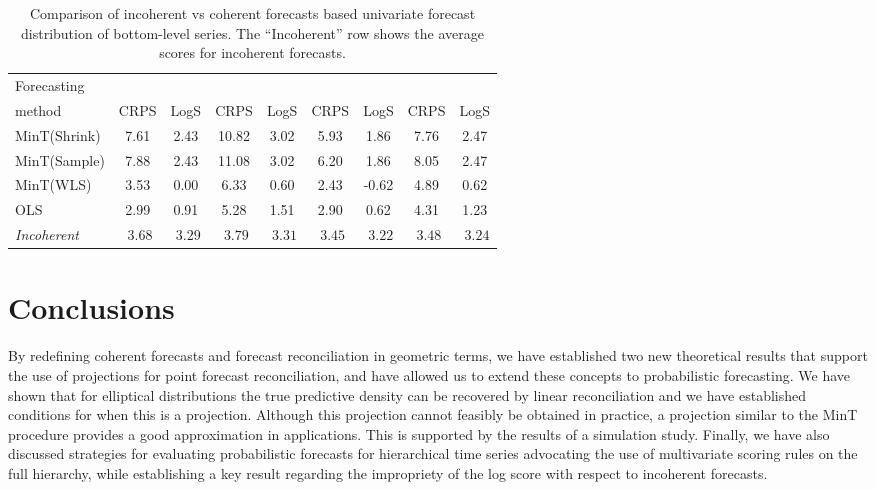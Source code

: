 \documentclass[12pt]{article}
\def\mathbi#1{\textit{ #1}}
\theoremstyle{definition}
\begin{document}
\begin{table}
	\caption{Comparison of incoherent vs coherent forecasts based univariate forecast distribution of bottom-level series. The ``Incoherent'' row shows the average scores for incoherent forecasts.}\label{table:5}
	\centering\tabcolsep=0.08cm\small
	\begin{tabular}{@{}lSSSSSSSS@{}}
		\toprule
		Forecasting &
		 &
		 &
		 &
		 \\
		\cmidrule(lr){2-3} \cmidrule(lr){4-5} \cmidrule(lr){6-7} \cmidrule(l){8-9}
		method       & CRPS   & LogS    & CRPS   & LogS    & CRPS   & LogS    & CRPS   & LogS \\
		\midrule
		MinT(Shrink) &  7.61  &  2.43  &  10.82  &  3.02  &  5.93  &  1.86  &  7.76  & 2.47  \\
		MinT(Sample) &  7.88  &  2.43  &  11.08  &  3.02  &  6.20  &  1.86  &  8.05  & 2.47  \\
		MinT(WLS)    &  3.53  &  0.00  &   6.33  &  0.60  &  2.43  & -0.62  &  4.89  & 0.62  \\
		OLS          &  2.99  &  0.91  &   5.28  &  1.51  &  2.90  &  0.62  &  4.31  & 1.23  \\
		\midrule
		\textit{Incoherent} & $\mathbi{3.68}$ & $\mathbi{3.29}$ & $\mathbi{3.79}$ & $\mathbi{3.31}$ & $\mathbi{3.45}$ & $\mathbi{3.22}$ & $\mathbi{3.48}$ & $\mathbi{3.24}$ \\
		\bottomrule
	\end{tabular}
\end{table}

\section{Conclusions}\label{sec:conclusions}


By redefining coherent forecasts and forecast reconciliation in geometric terms, we have established two new theoretical results that support the use of projections for point forecast reconciliation, and have allowed us to extend these concepts to probabilistic forecasting. We have shown that for elliptical distributions the true predictive density can be recovered by linear reconciliation and we have established conditions for when this is a projection. Although this projection cannot feasibly be obtained in practice, a projection similar to the MinT procedure provides a good approximation in applications. This is supported by the results of a simulation study. Finally, we have also discussed strategies for evaluating probabilistic forecasts for hierarchical time series advocating the use of multivariate scoring rules on the full hierarchy, while establishing a key result regarding the impropriety of the log score with respect to incoherent forecasts.
\end{document}
